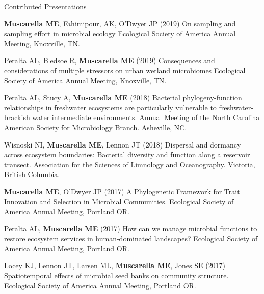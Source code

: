 \documentclass{resume} %
\begin{document}

\begin{rSection}{Contributed Presentations}

  {\bf Muscarella ME}, Fahimipour, AK, O'Dwyer JP (2019) 	
  On sampling and sampling effort in microbial ecology
  Ecological Society of America Annual Meeting, Knoxville, TN.

  Peralta AL, Bledsoe R, {\bf Muscarella ME} (2019)
  Consequences and considerations of multiple stressors on urban wetland microbiomes
  Ecological Society of America Annual Meeting, Knoxville, TN.

  Peralta AL, Stucy A, {\bf Muscarella ME} (2018) 
  Bacterial phylogeny-function relationships in freshwater ecosystems are particularly vulnerable 
  to freshwater-brackish water intermediate environments.
  Annual Meeting of the North Carolina American Society for Microbiology Branch. Asheville, NC.

  Wisnoski NI, {\bf Muscarella ME}, Lennon JT (2018) Dispersal and dormancy
  across ecosystem boundaries: Bacterial diversity and function along a
  reservoir transect. Association for the Sciences of Limnology and
  Oceanography. Victoria, British Columbia.

  {\bf Muscarella ME}, O'Dwyer JP (2017) A Phylogenetic Framework for Trait
   Innovation and Selection in Microbial Communities.
   Ecological Society of America Annual Meeting, Portland OR.

  Peralta AL, {\bf Muscarella ME} (2017) How can we manage microbial functions
  to restore ecosystem services in human-dominated landscapes?
  Ecological Society of America Annual Meeting, Portland OR.

  Locey KJ, Lennon JT, Larsen ML, {\bf Muscarella ME}, Jones SE (2017)
  Spatiotemporal effects of microbial seed banks on community structure.
  Ecological Society of America Annual Meeting, Portland OR.


\end{rSection}
\end{document}

